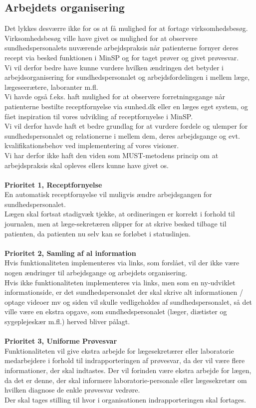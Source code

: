 \subsection{Arbejdets organisering} 
Det lykkes desværre ikke for os at få mulighed for at fortage virksomhedsbesøg. Virksomhedsbesøg ville have givet os mulighed for at observere sundhedspersonalets nuværende arbejdspraksis når patienterne fornyer deres recept via besked funktionen i MinSP og for taget prøver og givet prøvesvar. \\
Vi vil derfor bedre have kunne vurdere hvilken ændringen det betyder i arbejdsorganisering for sundhedspersonalet og arbejdsfordelingen i mellem læge, lægeseerætere, laboranter m.fl.\\
Vi havde også f.eks. haft mulighed for at observere forretningsgange når patienterne bestilte receptfornyelse via sunhed.dk eller en læges eget system, og fået inspiration til vores udvikling af receptfornyelse i MinSP.\\
Vi vil derfor havde haft et bedre grundlag for at vurdere fordele og ulemper for sundhedspersonalet og relationerne i mellem dem, deres arbejdsgange og evt. kvalifikationsbehov ved implementering af vores visioner.\\
Vi har derfor ikke haft den viden som MUST-metodens princip om at arbejdspraksis skal opleves ellers kunne have givet os.
\\
\\
\textbf{Prioritet 1, Receptfornyelse} \\
En automatisk receptfornyelse vil muligvis ændre arbejdsgangen for sundhedspersonalet. \\ 
Lægen skal fortsat stadigvæk tjekke, at ordineringen er korrekt i forhold til journalen, men at læge-sekretæren slipper for at skrive besked tilbage til patienten, da patienten nu selv kan se forløbet i statuslinjen.
%
\\\\
\textbf{Prioritet 2, Samling af al information} \\
Hvis funktionaliteten implementeres via links, som forslået, vil der ikke være nogen ændringer til arbejdsgange og arbejdets organisering. \\
Hvis ikke funktionaliteten implementeres via links, men som en ny-udviklet informationside, er det sundhedspersonalet der skal skrive alt informationen / optage videoer mv og siden vil skulle vedligeholdes af sundhedspersonalet, så det ville være en ekstra opgave, som sundhedspersonalet (læger, diætister og sygeplejeskær m.fl.) herved bliver pålagt.
\\\\
\textbf{Prioritet 3, Uniforme Prøvesvar} \\
Funktionaliteten vil give ekstra arbejde for lægesekretærer eller laboratorie medarbejdere i forhold til indrapporteringen af prøvesvar, da der vil være flere informationer, der skal indtastes. Der vil forinden være ekstra arbejde for lægen, da det er denne, der skal informere laboratorie-personale eller lægesekretær om hvilken diagnose de enkle prøvesvar vedrøre.\\
Der skal tages stilling til hvor i organisationen indrapporteringen skal fortages.
